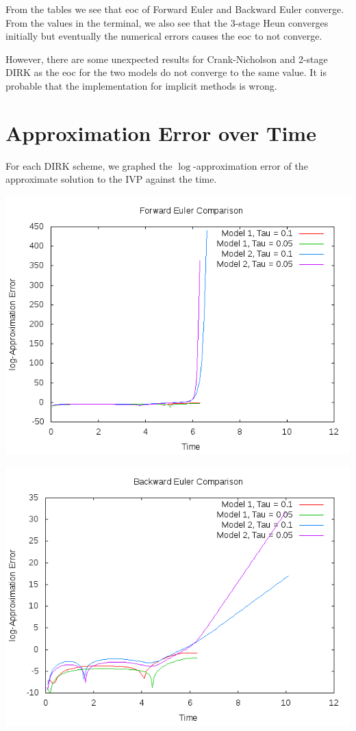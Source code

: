 \documentclass[letterpaper,12pt]{article}
\begin{document}
From the tables we see that eoc of Forward Euler and Backward Euler converge. From the values in the terminal, we also see that the 3-stage Heun converges initially but eventually the numerical errors causes the eoc to not converge. 

However, there are some unexpected results for Crank-Nicholson and 2-stage DIRK as the eoc for the two models do not converge to the same value. It is probable that the implementation for implicit methods is wrong.


\section{Approximation Error over Time}

For each DIRK scheme, we graphed the $\log$-approximation error of the approximate solution to the IVP against the time.


\centerline{\includegraphics[scale = 0.5]{FE.png}}

\centerline{\includegraphics[scale = 0.5]{BE.png}}
\end{document}
